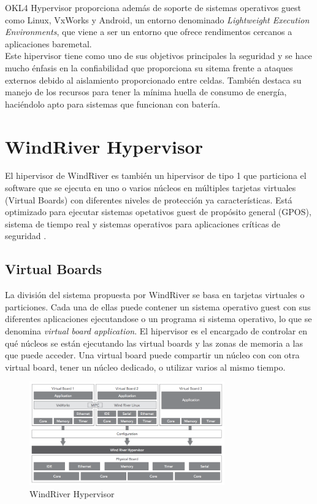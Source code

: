 OKL4 Hypervisor proporciona además de soporte de sistemas operativos guest como Linux, VxWorks y Android, un entorno denominado \textit{Lightweight Execution Environments}, que viene a ser un entorno que ofrece rendimentos cercanos a aplicaciones baremetal.\\
Este hipervisor tiene como uno de sus objetivos principales la seguridad \cite{okl4_2} y se hace mucho énfasis en la confiabilidad que proporciona su sitema frente a ataques externos debido al aislamiento proporcionado entre celdas. También destaca su manejo de los recursos para tener la mínima huella de consumo de energía, haciéndolo apto para sistemas que funcionan con batería.


\section{WindRiver Hypervisor}
El hipervisor de WindRiver es también un hipervisor de tipo 1 que particiona el software que se ejecuta en uno o varios núcleos en múltiples tarjetas virtuales (Virtual Boards) con diferentes niveles de protección ya características. Está optimizado para ejecutar sistemas opetativos guest de propósito general (GPOS), sistema de tiempo real y sistemas operativos para aplicaciones críticas de seguridad \cite{windriver_1}.
\subsection{Virtual Boards}
La división del sistema propuesta por WindRiver se basa en tarjetas virtuales o particiones. Cada una de ellas puede contener un sistema operativo guest con sus diferentes aplicaciones ejecutandose o un programa si sistema operativo, lo que se denomina \textit{virtual board application}. El hipervisor es el encargado de controlar en qué núcleos se están ejecutando las virtual boards y las zonas de memoria a las que puede acceder. Una virtual board puede compartir un núcleo con con otra virtual board, tener un núcleo dedicado, o utilizar varios al mismo tiempo.
\begin{figure}[!htb]
	\centering
	\includegraphics[width=0.75\textwidth]{recursos/windriver_hyp.png}
	\caption{WindRiver Hypervisor}
	\label{fig:windriver_hyp}
\end{figure}


